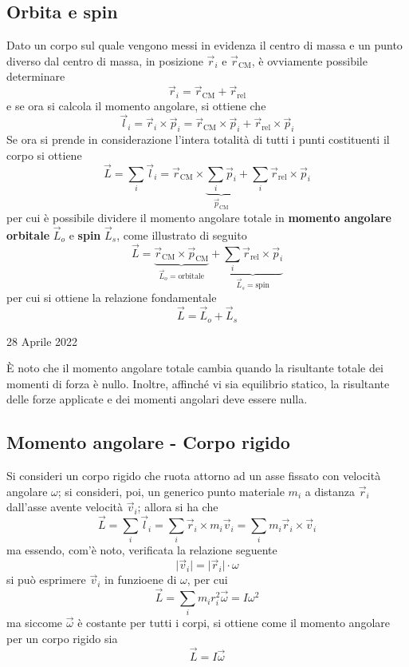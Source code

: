 \documentclass[a4paper]{extarticle}
\begin{document}
\vspace{1em}
\subsection{Orbita e spin}
Dato un corpo sul quale vengono messi in evidenza il centro di massa e un punto diverso dal centro di massa, in posizione $\vec r_i$ e $\vec r_{\text{CM}}$, è ovviamente possibile determinare
\[\vec r_i = \vec r_{\text{CM}} + \vec r_{\text{rel}}\]
e se ora si calcola il momento angolare, si ottiene che
\[\vec l_i = \vec r_i \times \vec p_i = \vec r_{\text{CM}} \times \vec p_i + \vec r_{\text{rel}} \times \vec p_i\]
Se ora si prende in considerazione l'intera totalità di tutti i punti costituenti il corpo si ottiene
\[\vec L = \sum_i \vec l_i = \vec r_{\text{CM}} \times \underbrace{\sum_i \vec p_i}_{\vec p_{\text{CM}}} + \sum_i \vec r_{\text{rel}} \times \vec p_i\]
per cui è possibile dividere il momento angolare totale in \textbf{momento angolare orbitale} $\vec L_o$ e \textbf{spin} $\vec L_s$, come illustrato di seguito
\[\vec L = \underbrace{\vec r_{\text{CM}} \times \vec p_{\text{CM}}}_{\vec L_o = \text{orbitale}} + \underbrace{\sum_{i} \vec r_{\text{rel}} \times \vec p_i}_{\vec L_s = \text{spin}}\]
per cui si ottiene la relazione fondamentale
\[\boxed{\vec L = \vec L_o + \vec L_s}\]

\newpage
\noindent
\begin{center}
  28 Aprile 2022
\end{center}
È noto che il momento angolare totale cambia quando la risultante totale dei momenti di forza è nullo. Inoltre, affinché vi sia equilibrio statico, la risultante delle forze applicate e dei momenti angolari deve essere nulla.

\vspace{1em}
\subsection{Momento angolare - Corpo rigido}
Si consideri un corpo rigido che ruota attorno ad un asse fissato con velocità angolare $\omega$; si consideri, poi, un generico punto materiale $m_i$ a distanza $\vec r_i$ dall'asse avente velocità $\vec v_i$; allora si ha che
\[\vec L = \sum_i \vec l_i = \sum_i \vec r_i \times m_i \vec v_i = \sum_i m_i \vec r_i \times \vec v_i\]
ma essendo, com'è noto, verificata la relazione seguente
\[\vert \vec v_i \vert = \vert \vec r_i \vert \cdot \omega\]
si può esprimere $\vec v_i$ in funzioene di $\omega$, per cui
\[\vec L = \sum_i m_i r_i^2 \vec \omega = I \omega^2\]
ma siccome $\vec \omega$ è costante per tutti i corpi, si ottiene come il momento angolare per un corpo rigido sia
\[\boxed{\vec L = I \vec \omega}\]
\end{document}
